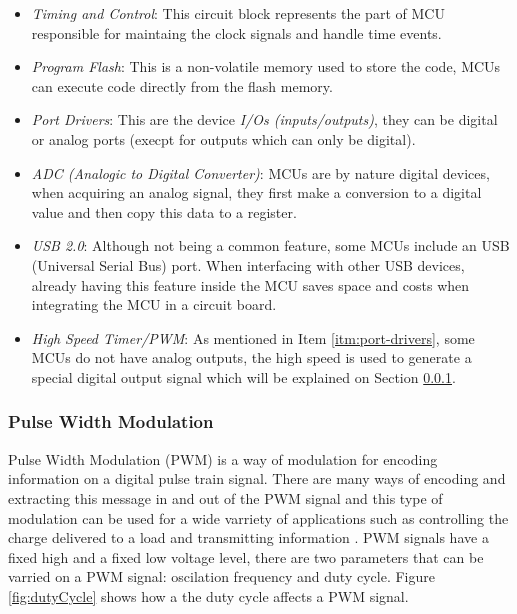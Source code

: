 		\begin{itemize}
			\item\textit{Timing and Control}: This circuit block represents the part of MCU responsible for maintaing the clock signals and handle time events.\label{itm:timing-and-control}
			\item\textit{Program Flash}: This is a non-volatile memory used to store the code, MCUs can execute code directly from the flash memory.\label{itm:program-flash}
			\item\textit{Port Drivers}: This are the device \textit{I/Os (inputs/outputs)}, they can be digital or analog ports (execpt for outputs which can only be digital).\label{itm:port-drivers}
			\item\textit{ADC (Analogic to Digital Converter)}: MCUs are by nature digital devices, when acquiring an analog signal, they first make a conversion to a digital value and then copy this data to a register.\label{itm:adc}
			\item\textit{USB 2.0}: Although not being a common feature, some MCUs include an USB (Universal Serial Bus) port. When interfacing with other USB devices, already having this feature inside the MCU saves space and costs when integrating the MCU in a circuit board.\label{itm:mcu-usb}
			\item\textit{High Speed Timer/PWM}: As mentioned in Item \ref{itm:port-drivers}, some MCUs do not have analog outputs, the high speed is used to generate a special digital output signal which will be explained on Section \ref{ssec:mcu-pwm}.\label{itm:high-speed-timer-pwm}
		\end{itemize}

	\subsubsection{Pulse Width Modulation} \label{ssec:mcu-pwm}
			Pulse Width Modulation (PWM) is a way of modulation for encoding information on a digital pulse train signal. There are many ways of encoding and extracting this message in and out of the PWM signal and this type of modulation can be used for a wide varriety of applications such as controlling the charge delivered to a load and transmitting information \cite{standard19961037c}. PWM signals have a fixed high and a fixed low voltage level, there are two parameters that can be varried on a PWM signal: oscilation frequency and duty cycle. Figure \ref{fig:dutyCycle} shows how a the duty cycle affects a PWM signal. 

